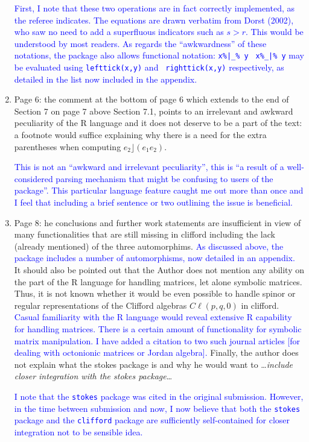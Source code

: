 \documentclass{article}
\newcommand{\cliff}[1]{\ensuremath{C\ell\left(#1\right)}}
\begin{document}
\begin{enumerate}
\textcolor{blue}{First, I note that these two operations are in fact
  correctly implemented, as the referee indicates.  The equations are
  drawn verbatim from Dorst (2002), who saw no need to add a
  superfluous indicators such as $s>r$. This would be understood by
  most readers.  As regards the ``awkwardness'' of these notations,
  the package also allows functional notation: {\tt x\%|\_\% y} {\tt
    x\%\_|\% y} may be evaluated using {\tt lefttick(x,y)} and {\tt
    righttick(x,y)} respectively, as detailed in the list now included
  in the appendix.}

\item Page 6: the comment at the bottom of page 6 which extends to the
  end of Section 7 on page 7 above Section 7.1, points to an
  irrelevant and awkward peculiarity of the R language and it does not
  deserve to be a part of the text: a footnote would suffice
  explaining why there is a need for the extra parentheses when
  computing $e_2\rfloor (e_1e_2)$.

  \textcolor{blue}{This is not an ``awkward and irrelevant
    peculiarity'', this is ``a result of a well-considered parsing
    mechanism that might be confusing to users of the package''.  This
    particular language feature caught me out more than once and I
    feel that including a brief sentence or two outlining the issue is
    beneficial.}

    
\item Page 8: he conclusions and further work statements are
  insufficient in view of many functionalities that are still missing
  in clifford including the lack (already mentioned) of the three
  automorphims. \textcolor{blue}{As discussed above, the package
    includes a number of automorphisms, now detailed in an appendix.}
  It should also be pointed out that the Author does not mention any
  ability on the part of the R language for handling matrices, let
  alone symbolic matrices.  Thus, it is not known whether it would be
  even possible to handle spinor or regular representations of the
  Clifford algebras \cliff{p, q, 0} in clifford.
  \textcolor{blue}{Casual familiarity with the R language would reveal
    extensive R capability for handling matrices.  There is a certain
    amount of functionality for symbolic matrix manipulation.  I have
    added a citation to two such journal articles [for dealing with
      octonionic matrices or Jordan algebra].}  Finally, the author
  does not explain what the stokes package is and why he would want to
  \ldots{\em include closer integration with the stokes package}\ldots

  \textcolor{blue}{I note that the {\tt stokes} package was cited in
    the original submission.  However, in the time between submission
    and now, I now believe that both the {\tt stokes} package and the
    {\tt clifford} package are sufficiently self-contained for closer
    integration not to be sensible idea.}


\end{enumerate}
\end{document}

